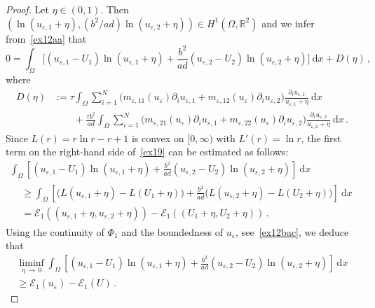 \documentclass[10pt]{amsart}
\theoremstyle{definition}\newtheorem{defi}[theo]{Definition}\newtheorem{rema}[theo]{Remark}\newtheorem{exam}[theo]{Example}\newtheorem{exem}[theo]{Example}\newtheorem{nota}[theo]{Notation}
\newcommand{\bbR}{\mathbb{R}}
\newcommand{\clE}{\mathcal{E}}
\newcommand{\rmd}{\mathrm{d}}
\begin{document}
\begin{proof}
Let $\eta\in (0,1)$. Then $\left(\ln{(u_{\varepsilon,1}+\eta)}, (b^2/ad)\ln{(u_{\varepsilon,2}+\eta) } \right)\in H^1(\Omega,\bbR^2)$ and we infer from~\eqref{ex12aa} that
\begin{equation}\label{ex19}
0 = \int_\Omega \Big[(u_{\varepsilon,1} - U_1) \ln{(u_{\varepsilon,1}+\eta)} + \frac{b^2}{ad} (u_{\varepsilon,2} - U_2)\ln{(u_{\varepsilon,2}+\eta)} \Big]\ \rmd x +D(\eta)\,,
\end{equation}
where
\begin{align*}
D(\eta)&:= \tau \int_\Omega \sum_{i=1}^N\big(m_{\varepsilon,11}(u_{\varepsilon}) \partial_i u_{\varepsilon,1} + m_{\varepsilon,12}(u_{\varepsilon}) \partial_i u_{\varepsilon,2} \big)
\frac{\partial_i u_{\varepsilon,1}}{u_{\varepsilon,1}+\eta}\ \rmd x \\[1ex]
& \qquad + \frac{\tau b^2}{ad} \int_\Omega \sum_{i=1}^N\big(m_{\varepsilon,21}(u_{\varepsilon}) \partial_i u_{\varepsilon,1} + m_{\varepsilon,22}(u_{\varepsilon}) \partial_i u_{\varepsilon,2} \big)
\frac{\partial_i u_{\varepsilon,2}}{u_{\varepsilon,2}+\eta}\ \rmd x \,.
\end{align*}
Since $L(r)=r\ln r-r+1$ is convex on $[0,\infty)$ with $L'(r)=\ln{r}$, the first term on the right-hand side of~\eqref{ex19} can be estimated as follows:
\begin{multline*}
\int_\Omega \left[(u_{\varepsilon,1} - U_1) \ln{(u_{\varepsilon,1}+\eta)} + \frac{b^2}{ad} (u_{\varepsilon,2} - U_2)\ln{(u_{\varepsilon,2}+\eta)} \right]\ \rmd x \\[1ex]
\begin{aligned}
& \ge \int_\Omega \left[\big(L(u_{\varepsilon,1}+\eta) - L(U_1+\eta)\big) + \frac{b^2}{ad}\big(L(u_{\varepsilon,2}+\eta) - L(U_2+\eta)\big) \right]\ \rmd x \\[1ex]
& = \clE_1((u_{\varepsilon,1}+\eta,u_{\varepsilon,2}+\eta))- \clE_1((U_{1}+\eta,U_{2}+\eta))\,.
\end{aligned}
\end{multline*}
Using the continuity of $\Phi_1$ and the boundedness of $u_\varepsilon$, see~\eqref{ex12bac}, we deduce that
\begin{multline}\label{ex20}
\liminf_{\eta\,\to\,0} \int_\Omega \left[(u_{\varepsilon,1} - U_1) \ln{(u_{\varepsilon,1}+\eta)} + \frac{b^2}{ad} (u_{\varepsilon,2} - U_2)\ln{(u_{\varepsilon,2}+\eta)} \right]\ \rmd x \\
\ge \clE_1(u_{ \varepsilon})- \clE_1(U)\,. 
\end{multline}

\end{proof}
\end{document}
